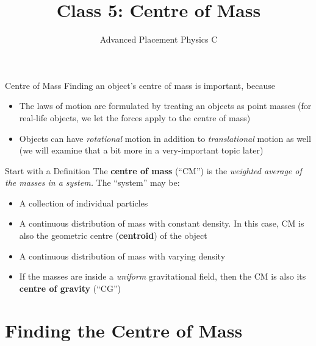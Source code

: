 \documentclass[12pt,compress,aspectratio=169]{beamer}
\title{Class 5: Centre of Mass}
\subtitle{Advanced Placement Physics C}
\begin{document}
\begin{frame}
  \maketitle
\end{frame}



\begin{frame}{Centre of Mass}
  Finding an object's centre of mass is important, because
  \begin{itemize}
  \item The laws of motion are formulated by treating an objects as point
    masses (for real-life objects, we let the forces apply to the centre of
    mass)
  \item Objects can have \emph{rotational} motion in addition to
    \emph{translational} motion as well (we will examine that a bit more in a
    very-important topic later)
  \end{itemize}
\end{frame}



\begin{frame}{Start with a Definition}
  The \textbf{centre of mass} (``CM'') is the \emph{weighted average of the
  masses in a system.} The ``system'' may be:
  \begin{itemize}
  \item A collection of individual particles
  \item A continuous distribution of mass with constant density. In this case,
    CM is also the geometric centre (\textbf{centroid}) of the object
  \item A continuous distribution of mass with varying density
  \item If the masses are inside a \emph{uniform} gravitational field, then the
    CM is also its \textbf{centre of gravity} (``CG'')
  \end{itemize}
\end{frame}


\section{Finding the Centre of Mass}
\end{document}

